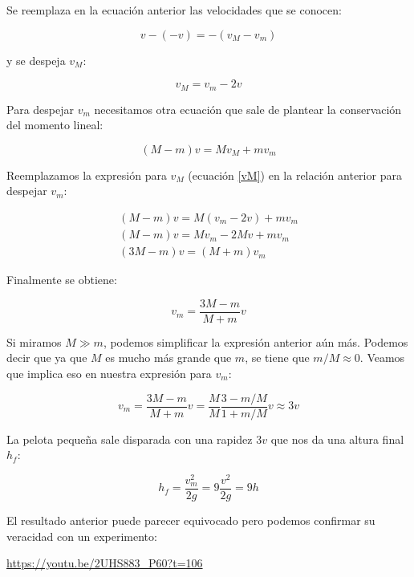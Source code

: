 \documentclass[a4paper,11pt]{article}
\begin{document}
Se reemplaza en la ecuación anterior las velocidades que se conocen:

\begin{equation}
v - (-v) = -(v_M - v_m)
\end{equation}

y se despeja $v_M$:

\begin{equation}
v_M = v_m - 2v \label{vM}
\end{equation}

Para despejar $v_m$ necesitamos otra ecuación que sale de plantear la conservación del momento lineal:

\begin{equation}
(M-m)v = M v_M + m v_m
\end{equation}

Reemplazamos la expresión para $v_M$ (ecuación \ref{vM}) en la relación anterior para despejar $v_m$:



\begin{align*}
(M-m)v = M (v_m - 2v) + m v_m\\
(M-m)v = Mv_m - 2Mv + m v_m\\
(3M-m)v = (M+m) v_m
\end{align*}



Finalmente se obtiene:

\begin{equation}
v_m = \frac{3M-m}{M+m} v
\end{equation}

Si miramos $M \gg m$, podemos simplificar la expresión anterior aún más. Podemos decir que ya que $M$ es mucho más grande que $m$, se tiene que $m/M \approx 0$. Veamos que implica eso en nuestra expresión para $v_m$:

\begin{equation}
v_m = \frac{3M-m}{M+m} v =  \frac{M}{M}\frac{3-m/M}{1+m/M} v \approx 3 v
\end{equation}

La pelota pequeña sale disparada con una rapidez $3v$ que nos da una altura final $h_f$:

\begin{equation}
h_f = \frac{v_m^2}{2g} = 9\frac{v^2}{2g} =  9 h
\end{equation}

El resultado anterior puede parecer equivocado pero podemos confirmar su veracidad con un experimento:


\url{https://youtu.be/2UHS883_P60?t=106}
\end{document}
